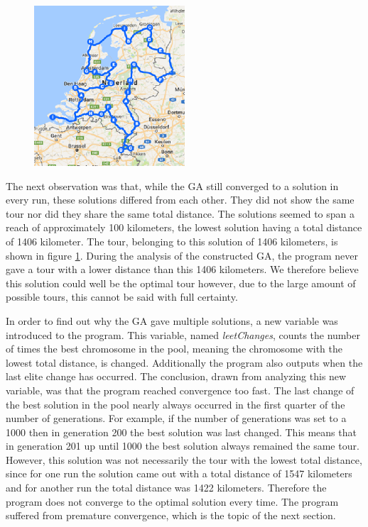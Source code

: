 \begin{figure}
	\vspace{-1cm}
	\begin{center}
		\includegraphics[width=0.5\textwidth]{1406tour}
	\end{center}	
	\label{1406tour}
\end{figure}

The next observation was that, while the GA still converged to a solution in every run, these solutions differed from each other. They did not show the same tour nor did they share the same total distance. The solutions seemed to span a reach of approximately 100 kilometers, the lowest solution having a total distance of 1406 kilometer. The tour, belonging to this solution of 1406 kilometers, is shown in figure \ref{1406tour}. During the analysis of the constructed GA, the program never gave a tour with a lower distance than this 1406 kilometers. We therefore believe this solution could well be the optimal tour however, due to the large amount of possible tours, this cannot be said with full certainty. 

\par
In order to find out why the GA gave multiple solutions, a new variable was introduced to the program. This variable, named \textit{leetChanges}, counts the number of times the best chromosome in the pool, meaning the chromosome with the lowest total distance, is changed. Additionally the program also outputs when the last elite change has occurred. The conclusion, drawn from analyzing this new variable, was that the program reached convergence too fast. The last change of the best solution in the pool nearly always occurred in the first quarter of the number of generations. For example, if the number of generations was set to a 1000 then in generation 200 the best solution was last changed. This means that in generation 201 up until 1000 the best solution always remained the same tour. However, this solution was not necessarily the tour with the lowest total distance, since for one run the solution came out with a total distance of 1547 kilometers and for another run the total distance was 1422 kilometers. Therefore the program does not converge to the optimal solution every time. The program suffered from premature convergence, which is the topic of the next section. 

